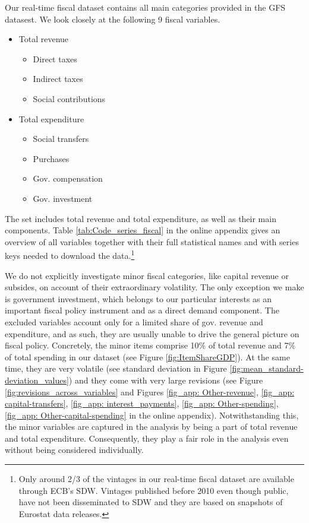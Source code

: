 Our real-time fiscal dataset contains all main categories
provided in the GFS datasest. We look closely at the following 9 fiscal variables.
\begin{itemize}
    \item Total revenue
    \begin{itemize}
        \item {{Direct taxes}}
        \item {{Indirect taxes}}
        \item {{Social contributions}}
    \end{itemize}
    \item Total expenditure
    \begin{itemize}
        \item {{Social transfers}}
        \item {{Purchases}}
        \item {{Gov. compensation}}
        \item {{Gov. investment}}
    \end{itemize}
\end{itemize}

The set includes total revenue and total expenditure, as well as their main components. Table \ref{tab:Code_series_fiscal} in the online appendix gives an overview of all variables together with their full statistical names and with series keys needed to download the data.\footnote{Only around 2/3 of the vintages in our real-time fiscal dataset are available through ECB's SDW. Vintages published before 2010 even though public, have not been disseminated to SDW and they are based on snapshots of Eurostat data releases.}

We do not explicitly investigate minor fiscal categories, like
capital revenue or subsides, on account of their extraordinary volatility. The only exception we make is government investment, which belongs to our particular interests as an important fiscal policy instrument and as a direct demand component. The excluded variables account only for a limited share of gov. revenue and expenditure, and as such, they are usually unable to drive the general picture on fiscal policy. Concretely, the minor items comprise 10\% of total revenue
and 7\% of total spending in our dataset (see Figure \ref{fig:ItemShareGDP}).
At the same time, they are very volatile (see standard deviation in Figure 
\ref{fig:mean_standard-deviation_values}) and they come with very large revisions (see Figure \ref{fig:revisions_across_variables} and Figures \ref{fig_app: Other-revenue}, \ref{fig_app: capital-transfers}, \ref{fig_app: interest_payments}, \ref{fig_app: Other-spending}, \ref{fig_app: Other-capital-spending} in the online appendix). Notwithstanding this, the minor variables are captured in the analysis by being a part of total revenue and total expenditure. Consequently, they play a fair role in the analysis even without being considered individually.

